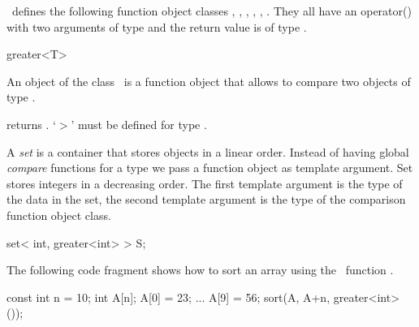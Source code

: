 
\stl\  defines the following function object classes ,
, , ,
, . They all have an
operator() with two arguments of type  and the return value
is of type .

\begin{ccClassTemplate}{greater<T>}

\ccDefinition
An object of the class \ccClassName\ is a function object that allows
to compare two objects of type . 


\ccOperations

{returns .
\ccPrecond `$>$' must be defined for type .}
\end{ccClassTemplate} 


\ccExample

A {\em set} is a container that stores objects in a linear
order. Instead of having global {\em compare} functions for a type we
pass a function object as template argument. Set  stores
integers in a decreasing order. The first template argument is the
type of the data in the set, the second template argument is the type
of the comparison function object class.


\begin{cprog}
{
    set< int, greater<int> > S;
}
\end{cprog}


The following code fragment shows how to sort an array using the
\stl\ function .

\begin{cprog}
{
    const int n = 10;
    int A[n];
    A[0] = 23;
    ...
    A[9] = 56;
    sort(A, A+n, greater<int>());
}
\end{cprog} 
